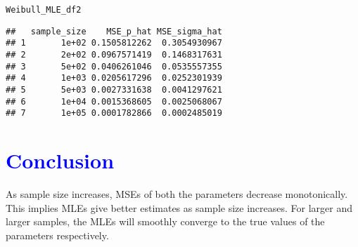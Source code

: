\documentclass[11pt, a4paper]{article}\usepackage[]{graphicx}\usepackage[]{xcolor}
\makeatletter
\newcommand{\hldef}[1]{\textcolor[rgb]{0.345,0.345,0.345}{#1}}%
\newenvironment{kframe}{%
 \def\at@end@of@kframe{}%
 \ifinner\ifhmode%
  \def\at@end@of@kframe{\end{minipage}}%
  \begin{minipage}{\columnwidth}%
 \fi\fi%
 \def\FrameCommand##1{\hskip\@totalleftmargin \hskip-\fboxsep
 \colorbox{shadecolor}{##1}\hskip-\fboxsep
     \hskip-\linewidth \hskip-\@totalleftmargin \hskip\columnwidth}%
 \MakeFramed {\advance\hsize-\width
   \@totalleftmargin\z@ \linewidth\hsize
   \@setminipage}}%
 {\par\unskip\endMakeFramed%
 \at@end@of@kframe}
\newenvironment{knitrout}{}{} %
\makeatother
\begin{document}
\begin{knitrout}
\color{fgcolor}\begin{kframe}
\begin{alltt}
\hldef{Weibull_MLE_df2}
\end{alltt}
\begin{verbatim}
##   sample_size    MSE_p_hat MSE_sigma_hat
## 1       1e+02 0.1505812262  0.3054930967
## 2       2e+02 0.0967571419  0.1468317631
## 3       5e+02 0.0406261046  0.0535557355
## 4       1e+03 0.0205617296  0.0252301939
## 5       5e+03 0.0027331638  0.0041297621
## 6       1e+04 0.0015368605  0.0025068067
## 7       1e+05 0.0001782866  0.0002485019
\end{verbatim}
\end{kframe}
\end{knitrout}


\section*{\faArrowAltCircleRight[regular] \textcolor{blue}{Conclusion}}

\smallpencil \hspace{0.3cm} {\setlength{\spaceskip}{1em plus 0.5em minus 0.5em} \fontsize{17}{20}\myfont As sample size increases, MSEs of both the parameters decrease monotonically. This implies MLEs give better estimates as sample size increases. For larger and larger samples, the MLEs will smoothly converge to the true values of the parameters respectively. \par}
\end{document}
